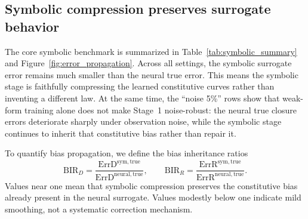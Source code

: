 \subsection{Symbolic compression preserves surrogate behavior}

The core symbolic benchmark is summarized in Table~\ref{tab:symbolic_summary} and Figure~\ref{fig:error_propagation}. Across all settings, the symbolic surrogate error remains much smaller than the neural true error. This means the symbolic stage is faithfully compressing the learned constitutive curves rather than inventing a different law. At the same time, the ``noise 5\%'' rows show that weak-form training alone does not make Stage~1 noise-robust: the neural true closure errors deteriorate sharply under observation noise, while the symbolic stage continues to inherit that constitutive bias rather than repair it.

To quantify bias propagation, we define the bias inheritance ratios
\begin{equation}
\mathrm{BIR}_D = \frac{\mathrm{ErrD}^{\mathrm{sym,true}}}{\mathrm{ErrD}^{\mathrm{neural,true}}},
\qquad
\mathrm{BIR}_R = \frac{\mathrm{ErrR}^{\mathrm{sym,true}}}{\mathrm{ErrR}^{\mathrm{neural,true}}}.
\end{equation}
Values near one mean that symbolic compression preserves the constitutive bias already present in the neural surrogate. Values modestly below one indicate mild smoothing, not a systematic correction mechanism.

